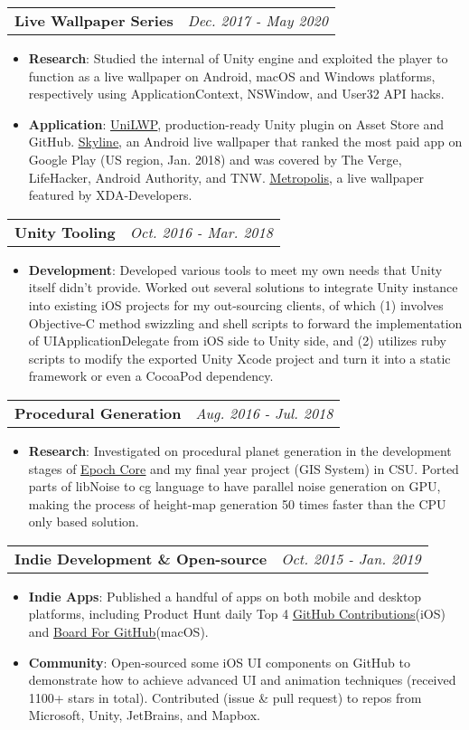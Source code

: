 \documentclass[letterpaper,11pt]{article}
\makeatletter
\newcommand{\resumeItem}[2]{
  \item\small{
    \textbf{#1}{: #2 \vspace{-2pt}}
  }
}
\newcommand{\resumeSubheadingWithTime}[3]{
  \vspace{-0pt}\item
    \begin{tabular*}{0.97\textwidth}[t]{l@{\extracolsep{\fill}}r}
      \textbf{#1} & \textit{\small #2} \\
    \end{tabular*}\vspace{-0pt}
    #3
    \vspace{-6pt}
}
\newcommand{\resumeItemListStart}{\begin{itemize}}
\newcommand{\resumeItemListEnd}{\end{itemize}\vspace{-5pt}}
\makeatother
\begin{document}
    \resumeSubheadingWithTime{Live Wallpaper Series}{Dec. 2017 - May 2020}
	\resumeItemListStart
        \resumeItem{Research}
          {Studied the internal of Unity engine and exploited the player to function as a live wallpaper on Android, macOS and Windows platforms, respectively using ApplicationContext, NSWindow, and User32 API hacks.}
        \resumeItem{Application}
          {\underline{\href{https://github.com/JustinFincher/UniLWP.Droid.Package.Free}{UniLWP}}, production-ready Unity plugin on Asset Store and GitHub.
           \underline{\href{https://portfolio.justzht.com/skylinelwp}{Skyline}}, an Android live wallpaper that ranked the most paid app on Google Play (US region, Jan. 2018) and was covered by The Verge, LifeHacker, Android Authority, and TNW.
           \underline{\href{https://portfolio.justzht.com/metropolislwp}{Metropolis}}, a live wallpaper featured by XDA-Developers.}
      \resumeItemListEnd
      
    \resumeSubheadingWithTime{Unity Tooling}{Oct. 2016 - Mar. 2018}
	\resumeItemListStart
        \resumeItem{Development}
          {Developed various tools to meet my own needs that Unity itself didn't provide. Worked out several solutions to integrate Unity instance into existing iOS projects for my out-sourcing clients, of which (1) involves Objective-C method swizzling and shell scripts to forward the implementation of UIApplicationDelegate from iOS side to Unity side, and (2) utilizes ruby scripts to modify the exported Unity Xcode project and turn it into a static framework or even a CocoaPod dependency.}
      \resumeItemListEnd
      
    \resumeSubheadingWithTime{Procedural Generation}{Aug. 2016 - Jul. 2018}
	\resumeItemListStart
        \resumeItem{Research}
          {Investigated on procedural planet generation in the development stages of \underline{\href{https://portfolio.justzht.com/epochcore}{Epoch Core}} and my final year project (GIS System) in CSU. Ported parts of libNoise to cg language to have parallel noise generation on GPU, making the process of height-map generation 50 times faster than the CPU only based solution.}
      \resumeItemListEnd

	\resumeSubheadingWithTime{Indie Development \& Open-source}{Oct. 2015 - Jan. 2019}
	\resumeItemListStart
		\resumeItem{Indie Apps}
          {Published a handful of apps on both mobile and desktop platforms, including Product Hunt daily Top 4 \underline{\href{https://github.com/JustinFincher/GitHubContributionsiOS}{GitHub Contributions}}(iOS) and \underline{\href{https://justinfincher.github.io/BoardForGitHub-Landing/}{Board For GitHub}}(macOS).}
        \resumeItem{Community}
          {Open-sourced some iOS UI components on GitHub to demonstrate how to achieve advanced UI and animation techniques (received 1100+ stars in total). Contributed (issue \& pull request) to repos from Microsoft, Unity, JetBrains, and Mapbox.}
      \resumeItemListEnd
      
\end{document}
